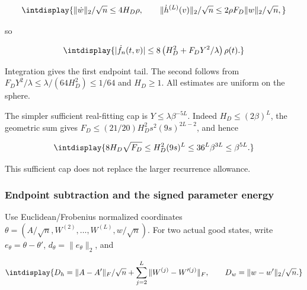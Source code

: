 \begingroup\renewcommand{\theHequation}{intdisplay.448}
\begin{equation*}
\intdisplay{
\|\dot w\|_2/\sqrt n\le4H_D\rho,\qquad
\|\dot h^{(L)}(v)\|_2/\sqrt n
\le2\rho F_D\|w\|_2/\sqrt n,
}
\end{equation*}
\endgroup


so


\begingroup\renewcommand{\theHequation}{intdisplay.449}
\begin{equation*}
\intdisplay{
|\dot f_n(t,v)|\le
8\left(H_D^2+F_DY^2/\lambda\right)\rho(t).
}
\end{equation*}
\endgroup


Integration gives the first endpoint tail. The second follows from \(F_DY^2/\lambda\le\lambda/(64H_D^2)\le1/64\) and \(H_D\ge1\). All estimates are uniform on the sphere.



The simpler sufficient real-fitting cap is \(Y\le\lambda\beta^{-5L}\). Indeed \(H_D\le(2\beta)^L\), the geometric sum gives \(F_D\le(21/20)H_D^2s^2(9s)^{2L-2}\), and hence


\begingroup\renewcommand{\theHequation}{intdisplay.450}
\begin{equation*}
\intdisplay{
8H_D\sqrt{F_D}\le H_D^2(9s)^L
\le36^L\beta^{3L}\le\beta^{5L}.
}
\end{equation*}
\endgroup


This sufficient cap does not replace the larger recurrence allowance.


\subsubsection{Endpoint subtraction and the signed parameter energy}



Use Euclidean/\allowbreak Frobenius normalized coordinates \(\theta=(A/\sqrt n,\allowbreak W^{(2)},\allowbreak \ldots,\allowbreak W^{(L)},\allowbreak w/\sqrt n)\). For two actual good states, write \(e_\theta=\theta-\theta'\), \(d_\theta=\|e_\theta\|_2\), and


\begingroup\renewcommand{\theHequation}{intdisplay.451}
\begin{equation*}
\intdisplay{
D_h=\|A-A'\|_F/\sqrt n+
\sum_{j=2}^L\|W^{(j)}-W'^{(j)}\|_F,
\qquad D_w=\|w-w'\|_2/\sqrt n.
}
\end{equation*}
\endgroup

